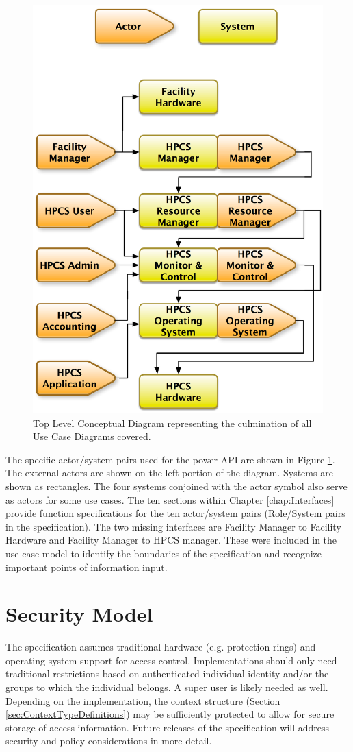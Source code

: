 \begin{figure}[!ht]
    \begin{center}
\includegraphics[height=0.6\textheight,width=.69\linewidth]{FIGURES/TopLevelDiagram}
    \end{center}
\caption{Top Level Conceptual Diagram representing the culmination of all Use Case Diagrams covered.}
\label{fig:UCDTopLevel}
\end{figure}

The specific actor/system pairs used for the power API are shown in Figure \ref{fig:UCDTopLevel}.
The external actors are shown on the left portion of the diagram. 
Systems are shown as rectangles. 
The four systems conjoined with the actor symbol also serve as actors for some use cases. 
The ten sections within Chapter \ref{chap:Interfaces} provide function specifications for the ten actor/system pairs (Role/System pairs in the specification).
The two missing interfaces are Facility Manager to Facility Hardware and Facility Manager to HPCS manager.
These were included in the use case model to identify the boundaries of the specification and recognize important points of information input. 

\section{Security Model}\label{sec:SecModel}
The specification assumes traditional hardware (e.g. protection rings) and operating system support for access control.
Implementations should only need traditional restrictions based on authenticated individual identity and/or the groups to which the individual belongs.
A super user is likely needed as well.
Depending on the implementation, the context structure (Section \ref{sec:ContextTypeDefinitions}) may be sufficiently protected to allow for secure storage of access information. Future releases of the specification will address security and policy considerations in more detail.
